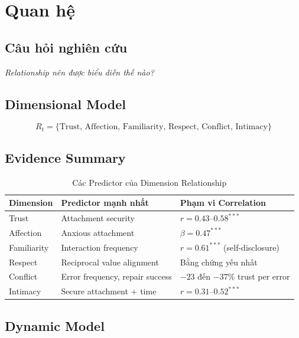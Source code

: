 \section{Quan hệ}

\subsection{Câu hỏi nghiên cứu}

\textit{Relationship nên được biểu diễn thế nào?}

\subsection{Dimensional Model}

\begin{equation}
R_t = \{\text{Trust, Affection, Familiarity, Respect, Conflict, Intimacy}\}
\end{equation}

\subsection{Evidence Summary}

\begin{table}[H]
\centering
\caption{Các Predictor của Dimension Relationship}
\label{tab:relationship-dims}
\begin{tabular}{lll}
\toprule
\textbf{Dimension} & \textbf{Predictor mạnh nhất} & \textbf{Phạm vi Correlation} \\
\midrule
Trust & Attachment security & $r=0.43$--$0.58^{***}$ \\
Affection & Anxious attachment & $\beta=0.47^{***}$ \\
Familiarity & Interaction frequency & $r=0.61^{***}$ (self-disclosure) \\
Respect & Reciprocal value alignment & Bằng chứng yếu nhất \\
Conflict & Error frequency, repair success & $-23$ đến $-37$\% trust per error \\
Intimacy & Secure attachment + time & $r=0.31$--$0.52^{***}$ \\
\bottomrule
\end{tabular}
\end{table}

\subsection{Dynamic Model}

